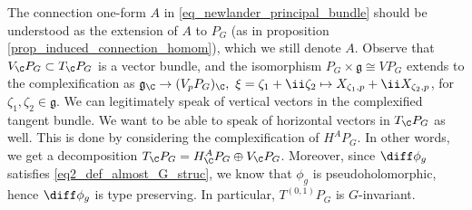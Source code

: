 The connection one-form \(A\) in \eqref{eq_newlander_principal_bundle} should be understood as the extension of \(A\) to \(P_G\) (as in proposition \ref{prop_induced_connection_homom}), which we still denote \(A\). Observe that \(V_\C P_G\subset T_\C P_G\) is a vector bundle, and the isomorphism \(P_G \times \mathfrak{g}\cong VP_G\) extends to the complexification as \(\mathfrak{g}_\C \to (V_pP_G)_\C, \ \xi=\zeta_1+\ii \zeta_2\mapsto X_{\zeta_1, p}+\ii X_{\zeta_2,p}\), for \(\zeta_1, \zeta_2 \in \mathfrak{g}\). We can legitimately speak of vertical vectors in the complexified tangent bundle. We want to be able to speak of horizontal vectors in \(T_\C P_G\) as well. This is done by considering the complexification of \(H^AP_G\). In other words, we get a decomposition \(T_\C P_G=H_\C^AP_G \oplus V_\C P_G\). Moreover, since \(\diff \phi_g\) satisfies \eqref{eq2_def_almost_G_struc}, we know that \(\phi_g\) is pseudoholomorphic, hence \(\diff \phi_g\) is type preserving. In particular, \(T^{(0,1)}P_G\) is \(G\)-invariant. 
